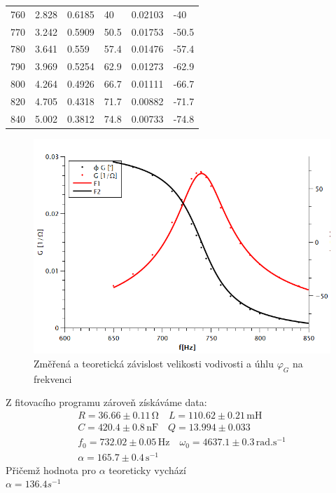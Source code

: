 \documentclass[czech,11pt,a4paper]{article}
\begin{document}
\begin{multicols}{2}
{\begin{tabular}{llllll}
			760      & 2.828    & 0.6185   & 40                                   & 0.02103                      & -40                      \\
			770      & 3.242    & 0.5909   & 50.5                                 & 0.01753                      & -50.5                    \\
			780      & 3.641    & 0.559    & 57.4                                 & 0.01476                      & -57.4                    \\
			790      & 3.969    & 0.5254   & 62.9                                 & 0.01273                      & -62.9                    \\
			800      & 4.264    & 0.4926   & 66.7                                 & 0.01111                      & -66.7                    \\
			820      & 4.705    & 0.4318   & 71.7                                 & 0.00882                      & -71.7                    \\
			840      & 5.002    & 0.3812   & 74.8                                 & 0.00733                      & -74.8                   
		\end{tabular}}\begin{figure}[H]
			\begin{center}
				\includegraphics[max width=0.9\linewidth, center]{RLCGphi}
				\caption{Změřená a teoretická závislost velikosti vodivosti a úhlu $\varphi_G$ na frekvenci}
				
			\end{center}
		\end{figure}
		Z fitovacího programu zároveň získáváme data:
		\begin{gather*}
			R = 36.66 \pm 0.11 \,\mathrm{\Omega}\quad L = 110.62 \pm 0.21 \,\mathrm{mH}\\
			C = 420.4 \pm 0.8 \,\mathrm{nF} \quad Q = 13.994 \pm 0.033 \\
			f_0 = 732.02 \pm 0.05 \,\mathrm{Hz} \quad\omega_0 = 4637.1 \pm 0.3 \,\mathrm{rad.s^{-1}}\\
			\alpha = 165.7 \pm 0.4 \,\mathrm{s^{-1}}
		\end{gather*}
		Přičemž hodnota pro $\alpha$ teoreticky vychází \\$\alpha = 136.4 s^{-1}$
\newpage
		

\end{multicols}
\end{document}
